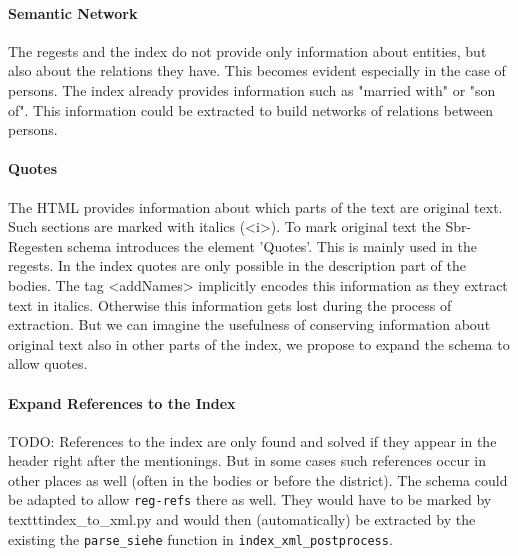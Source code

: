 \paragraph{Semantic Network}
The regests and the index do not provide only information about entities, but also about the relations they have. This becomes evident especially in the case of persons. The index already provides information such as "married with" or "son of". This information could be extracted to build networks of relations between persons.

\paragraph{Quotes}
The HTML provides information about which parts of the text are original text. Such sections are marked with italics (<i>). To mark original text the Sbr-Regesten schema introduces the element 'Quotes'. This is mainly used in the regests. In the index quotes are only possible in the description part of the bodies. The tag <addNames> implicitly encodes this information as they extract text in italics. Otherwise this information gets lost during the process of extraction. But we can imagine the usefulness of conserving information about original text also in other parts of the index, we propose to expand the schema to allow quotes.

\paragraph{Expand References to the Index}
TODO: References to the index are only found and solved if they appear in the header right after the mentionings. But in some cases such references occur in other places as well (often in the bodies or before the district). The schema could be adapted to allow \texttt{reg-refs} there as well. They would have to be marked by texttt{index\_to\_xml.py} and would then (automatically) be extracted by the existing the \texttt{parse\_siehe} function in \texttt{index\_xml\_postprocess}.